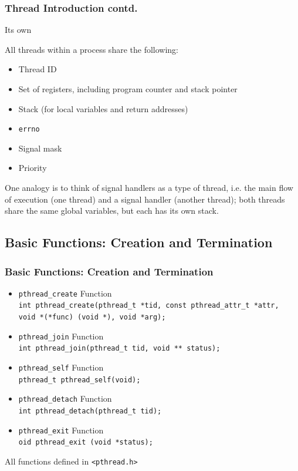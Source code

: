\documentclass[notes,serif]{beamer}
\begin{document}
\begin{frame}
  \frametitle{Thread Introduction contd.}
  \begin{alertblock}{Its own}
    {
    \small
    All threads within a process share the following:
  \begin{itemize}
    \item Thread ID
    \item Set of registers, including program counter and stack pointer
    \item Stack (for local variables and return addresses)
    \item \texttt{errno}
    \item Signal mask
    \item Priority
  \end{itemize}
  One analogy is to think of signal handlers as a type of thread, i.e. the main flow of execution (one thread) and a signal handler (another thread); both threads share the same global variables, but each has its own stack.
  }
  \end{alertblock}
\end{frame}

\subsection{Basic Functions: Creation and Termination}
\begin{frame}[containsverbatim]
  \frametitle{Basic Functions: Creation and Termination}
  \begin{itemize}
    \item \texttt{pthread\_create} Function \\
      {\scriptsize
      \verb+int pthread_create(pthread_t *tid, const pthread_attr_t *attr,+
      \verb+                       void *(*func) (void *), void *arg);+
      }
    \item \texttt{pthread\_join} Function \\
      {\scriptsize
      \verb+int pthread_join(pthread_t tid, void ** status);+
      }
    \item \texttt{pthread\_self} Function \\
      {\scriptsize
      \verb+pthread_t pthread_self(void);+
      }
    \item \texttt{pthread\_detach} Function \\
      {\scriptsize
      \verb+int pthread_detach(pthread_t tid);+
      }
    \item \texttt{pthread\_exit} Function \\
      {\scriptsize
      \verb+oid pthread_exit (void *status);+
      }
  \end{itemize}
  All functions defined in \verb+<pthread.h>+
\end{frame}
\end{document}
